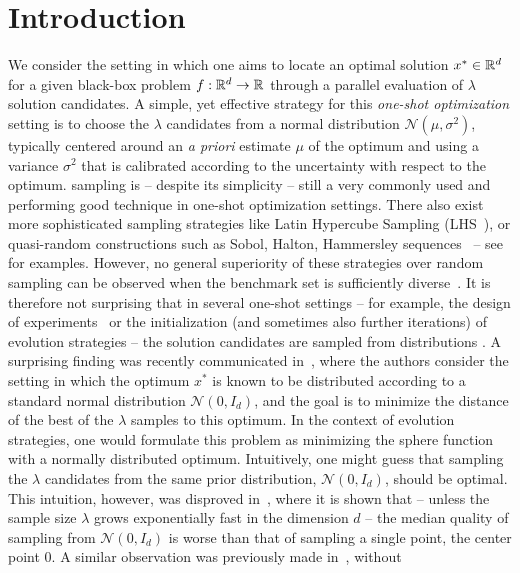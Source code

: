 \section{Introduction}
We consider the setting in which one aims to locate an optimal solution $x^* \in \mathbb{R}^d$ for a given black-box problem $f:\mathbb{R}^d \to \mathbb{R}$ 
through a parallel evaluation of $\lambda$ solution candidates. A simple, yet effective strategy for this \textit{one-shot optimization} setting is to choose the $\lambda$ candidates from a normal distribution $\mathcal{N}(\mu,\sigma^2)$, typically centered around an \textit{a priori} estimate $\mu$ of the optimum and using a variance $\sigma^2$ that is calibrated according to the uncertainty with respect to the optimum. 
 sampling is -- despite its simplicity -- still a very commonly used and performing good technique in one-shot optimization settings. There also exist more sophisticated sampling strategies like Latin Hypercube Sampling (LHS~\cite{LHS}), or quasi-random constructions such as Sobol, Halton, Hammersley sequences~\cite{DickP10,Mat99} -- see~\cite{bergstra,icmldoe} for examples. However, no general superiority of these strategies over random sampling can be observed when the benchmark set is sufficiently diverse~\cite{BossekKNND19}. It is therefore not surprising that in several one-shot settings -- for example, the design of experiments~\cite{nie,mckay,hammersley,atanasov} or the initialization (and sometimes also further iterations) of evolution strategies -- the solution candidates are  sampled from  distributions . 
A surprising finding was recently communicated in~\cite{icmldoe}, where the authors consider the setting in which the optimum $x^*$ is known to be distributed according to a standard normal distribution $\mathcal{N}(0,I_d)$, and the goal is to minimize the distance of the best of the $\lambda$ samples to this optimum. In the context of evolution strategies, one would formulate this problem as minimizing the sphere function with a normally distributed optimum. Intuitively, one might guess that sampling the $\lambda$ candidates from the same prior distribution, $\mathcal{N}(0,I_d)$, should be optimal. This intuition, however, was disproved in~\cite{icmldoe}, where it is shown that -- unless the sample size $\lambda$ grows exponentially fast in the dimension $d$ -- the median quality of sampling from $\mathcal{N}(0,I_d)$ is worse than that of sampling a single point,  the center point $0$. A similar observation was previously made in~\cite{centerbased}, without  %
